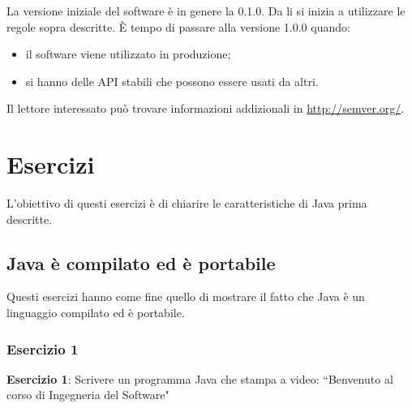 \documentclass{article}
\theoremstyle{definition}
\begin{document}
La versione iniziale del software \`e in genere la 0.1.0. Da li si inizia a utilizzare le regole sopra descritte.
\`E tempo di passare alla versione 1.0.0 quando:
\begin{itemize}
\item il software viene utilizzato in produzione;
\item si hanno delle API stabili che possono essere usati da altri.
\end{itemize}


Il lettore interessato pu\`o trovare informazioni addizionali in \url{http://semver.org/}.

\section{Esercizi}
L'obiettivo di questi esercizi \`e di chiarire le caratteristiche di Java prima descritte.

\subsection{Java \`e compilato ed \`e portabile}
Questi esercizi hanno come fine quello di mostrare il fatto che Java \`e un linguaggio compilato ed \`e portabile. 

\subsubsection{Esercizio 1}
\begin{framed}
\textbf{Esercizio 1}: Scrivere un programma Java che stampa a video: ``Benvenuto al corso di Ingegneria del Software"
\end{framed}
\end{document}
